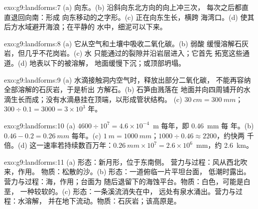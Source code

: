 \begin{solution}{exo:g9:landforms:7}
(a) 向东。(b) 沿斜向东北方向的向上冲三次，
每次之后都直直退回向南：形成
向东移动的之字形。(c) 正在向东生长，横跨
海湾口。(d) 使其后方水域避开海浪；在平静的
水中，细泥可以下来。
\end{solution}

\begin{solution}{exo:g9:landforms:8}
(a) 它从空气和土壤中吸收二氧化碳。(b) 弱酸
缓慢溶解石灰岩，但几乎不花岗岩。(c) 水
只能通过的裂隙并沿岩层进入；它首先
拓宽这些通道。(d) 地表以下的被溶解，
地面缓慢下沉；或顶部坍塌。
\end{solution}

\begin{solution}{exo:g9:landforms:9}
(a) 水滴接触洞内空气时，释放出部分二氧化碳，
不能再容纳全部溶解的石灰岩，于是析出
方解石。(b) 石笋由溅落在
地面并向四周铺开的水滴生长而成；没有水滴悬挂在顶端，以形成管状结构。
(c) $\qty{30}{cm} = \qty{300}{mm}$；$300 \div 0.1 = 3000 = 3 \times 10^3$
年。
\end{solution}

\begin{solution}{exo:g9:landforms:10}
(a) $4600 \div 10^7 = 4.6 \times 10^{-4}$~m 每年，即 \qty{0.46}{mm} 每
年。(b) $0.46 - 0.2 = \qty{0.26}{mm}$ 每年。(c) $\qty{1}{m} =
\qty{1000}{mm}$；$1000 \div 0.46 \approx 2200$，约快两
千倍。(d) 这一速率若持续数百万年：$\qty{0.26}{mm} \times
10^7 = 2.6 \times 10^6$~mm，约 \qty{2.6}{km}。
\end{solution}

\begin{solution}{exo:g9:landforms:11}
(a) 形态：新月形，位于东南侧。
营力与过程：风从西北吹来，作用。
物质：松散的沙。(b) 形态：一道俯临一片平坦台面，
低潮时露出。营力与过程：海，作用；台面为
随后退留下的海蚀平台。物质：白色，可能是白垩，
一种较软的。(c) 形态：一条溪流消失在中，
远处有泉水涌出。营力与过程：水溶解，
并在地下流动。物质：石灰岩；该高原是。
\end{solution}

